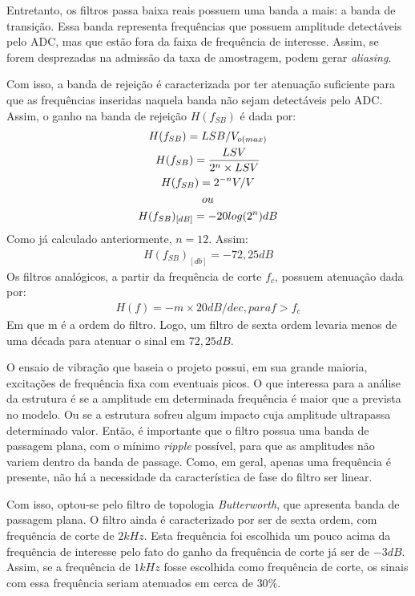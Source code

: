 \documentclass[11pt]{abntex2}
\begin{document}
				Entretanto, os filtros passa baixa reais possuem uma banda a mais: a
				banda de transição. Essa banda representa frequências que possuem
				amplitude detectáveis pelo ADC, mas que estão fora da faixa de
				frequência de interesse. Assim, se forem desprezadas na admissão da
				taxa de amostragem, podem gerar \textit{aliasing}.

				Com isso, a banda de rejeição é caracterizada por ter atenuação
				suficiente para que as frequências inseridas naquela banda não sejam
				detectáveis pelo ADC. Assim, o ganho na banda de rejeição $H(f_{SB})$ é
				dada por:
				\begin{gather*}
					H(f_{SB}) = LSB/V_{o(max)}\\
					H(f_{SB}) = \frac{LSV}{2^n\times LSV}\\
					H(f_{SB}) = 2^{-n}V/V\\
					ou\\
					H(f_{SB})_{[dB]} = -20\*log(2^n) dB
				\end{gather*}
				Como já calculado anteriormente, $n=12$. Assim:
				\begin{gather*}
					H(f_{SB})_{[db]} = -72,25 dB
				\end{gather*}
				Os filtros analógicos, a partir da frequência de corte $f_c$, possuem
				atenuação dada por:
				\begin{gather*}
					H(f) = -m\times 20 dB/dec, para f>f_c
				\end{gather*}
				Em que m é a ordem do filtro. Logo, um filtro de sexta ordem levaria
				menos de uma década para atenuar o sinal em $72,25dB$.

				O ensaio de vibração que baseia o projeto possui, em sua grande
				maioria, excitações de frequência fixa com eventuais picos. O que
				interessa para a análise da estrutura é se a amplitude em
				determinada frequência é maior que a prevista no modelo. Ou se a
				estrutura sofreu algum impacto cuja amplitude ultrapassa determinado
				valor. Então, é importante que o filtro possua uma banda de passagem
				plana, com o mínimo \textit{ripple} possível, para que as amplitudes não
				variem dentro da banda de passage. Como, em geral, apenas uma
				frequência é presente, não há a necessidade da característica de
				fase do filtro ser linear.

				Com isso, optou-se pelo filtro de topologia
				\textit{Butterworth}, que apresenta banda de passagem plana. O
				filtro ainda é caracterizado por ser de sexta ordem, com
				frequência de corte de $2kHz$. Esta frequência foi escolhida um
				pouco acima da frequência de interesse pelo fato do ganho da
				frequência de corte já ser de $-3dB$. Assim, se a frequência de
				$1kHz$ fosse escolhida como frequência de corte, os sinais com
				essa frequência seriam atenuados em cerca de $30\%$.
\end{document}
